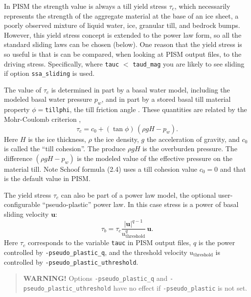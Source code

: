 In PISM the strength value is always a till yield stress $\tau_c$, which necessarily represents the strength of the aggregate material at the base of an ice sheet, a poorly observed mixture of liquid water, ice, granular till, and bedrock bumps.  However, this yield stress concept is extended to the power law form, so all the standard sliding laws can be chosen (below).  One reason that the yield stress is so useful is that is can be compared, when looking at PISM output files, to the driving stress.  Specifically, where \verb|tauc| $<$ \verb|taud_mag| you are likely to see sliding if option \verb|ssa_sliding| is used.

The value of $\tau_c$ is determined in part by a basal water model, including the modeled basal water pressure $p_w$, and in part by a stored basal till material property $\phi=$\texttt{tillphi}, the till friction angle \cite{Paterson}.  These quantities are related by the Mohr-Coulomb criterion \cite[Chapter 8]{Paterson}, 
\begin{equation*}
   \tau_c = c_{0} + (\tan\phi)\,(\rho g H - p_w).
\end{equation*}
Here $H$ is the ice thickness, $\rho$ the ice density, $g$ the acceleration of gravity, and $c_0$ is called the ``till cohesion''.  The produce $\rho g H$ is the overburden pressure.  The difference $(\rho g H - p_w)$ is the modeled value of the effective pressure on the material till.  Note Schoof \cite{SchoofStream} formula (2.4) uses a till cohesion value $c_0 = 0$ and that is the default value in PISM.

The yield stress $\tau_c$ can also be part of a power law model, the optional user-configurable ``pseudo-plastic'' power law.  In this case stress is a power of basal sliding velocity $\mathbf{u}$:
\begin{equation}
\tau_b = \tau_c \frac{|\mathbf{u}|^{q-1}}{u_{\text{threshold}}^q}\, \mathbf{u}.
\label{eq:pseudopower}
\end{equation}
Here $\tau_c$ corresponds to the variable \texttt{tauc} in PISM output files, $q$ is the power controlled by \texttt{-pseudo_plastic_q}, and the threshold velocity $u_{\text{threshold}}$ is controlled by \texttt{-pseudo_plastic_uthreshold}.

\begin{quote}
  \textbf{WARNING!} Options \texttt{-pseudo_plastic_q} and \texttt{-pseudo_plastic_uthreshold} have no effect if \texttt{-pseudo_plastic} is not set.
\end{quote}

